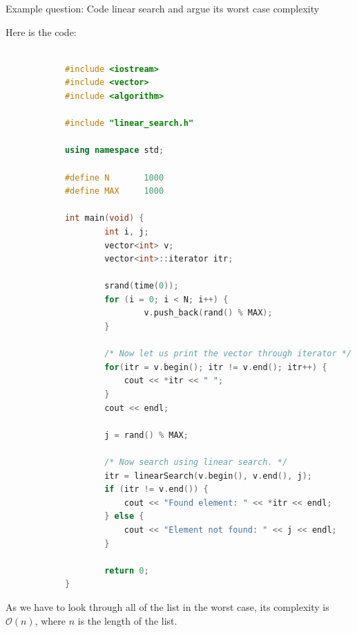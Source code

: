 \documentclass[addpoints,10pt,answers]{exam}
\begin{document}
 \boxedpoints
    \begin{center}
    \end{center}

    \begin{questions}
    \question Example question: Code linear search and argue its  worst case complexity
    \begin{solution}
    Here is the code:
        \begin{lstlisting}[language=C++,numbers=none]
        
            #include <iostream>
            #include <vector>
            #include <algorithm>
            
            #include "linear_search.h"
            
            using namespace std;
            
            #define N		1000
            #define MAX 	1000
            
            int main(void) {
                    int i, j;
                    vector<int> v;
                    vector<int>::iterator itr;
            
            		srand(time(0));
                    for (i = 0; i < N; i++) {
                            v.push_back(rand() % MAX);
                    }
            
                    /* Now let us print the vector through iterator */
                    for(itr = v.begin(); itr != v.end(); itr++) {
                        cout << *itr << " ";
                    }
                    cout << endl;
            
            		j = rand() % MAX;
            
            		/* Now search using linear search. */
                    itr = linearSearch(v.begin(), v.end(), j);
                    if (itr != v.end()) {
                        cout << "Found element: " << *itr << endl;
                    } else {
            			cout << "Element not found: " << j << endl;
            		}
            
            		return 0;
            }
        \end{lstlisting}


    As we have to look through all of the list in the worst case, its complexity is $\mathcal{O}(n)$, where $n$ is the length of the list.
    \end{solution}
    
    \end{questions}
\end{document}
